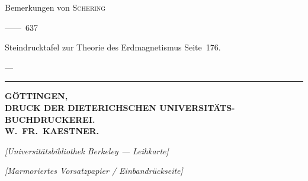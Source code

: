 \documentclass[12pt,a4paper]{article}
\newcommand{\inhaltentry}[3]{%
  \noindent\parbox[t]{0.72\textwidth}{\raggedright #1}%
  \hfill\parbox[t]{0.26\textwidth}{\raggedleft #2\quad---\quad#3}\par
  \vspace{0.3em}
}
\begin{document}
\inhaltentry{Bemerkungen von \textsc{Schering}}{}{---~637}

\vspace{0.3em}

\inhaltentry{Steindrucktafel zur Theorie des Erdmagnetismus Seite~176.}{}{}

\vfill

\begin{center}
\rule{0.5\textwidth}{0.4pt}
\end{center}

\vspace{2em}

\begin{center}
\textbf{GÖTTINGEN,}\\[0.5em]
\textbf{DRUCK DER DIETERICHSCHEN UNIVERSITÄTS-BUCHDRUCKEREI.}\\[0.5em]
\textbf{W.~FR.~KAESTNER.}
\end{center}

\newpage

\thispagestyle{empty}
\setcounter{page}{643}
\mbox{}
\newpage
\thispagestyle{empty}
\setcounter{page}{644}
\mbox{}
\newpage
\thispagestyle{empty}
\setcounter{page}{645}
\mbox{}
\newpage
\thispagestyle{empty}
\setcounter{page}{646}
\mbox{}

\newpage
\thispagestyle{empty}
\setcounter{page}{647}

\vfill

\begin{center}
\textit{[Universitätsbibliothek Berkeley --- Leihkarte]}
\end{center}

\begin{center}
\end{center}

\vfill

\newpage
\thispagestyle{empty}
\setcounter{page}{648}

\vfill

\begin{center}
\textit{[Marmoriertes Vorsatzpapier / Einbandrückseite]}
\end{center}

\vfill
\end{document}
